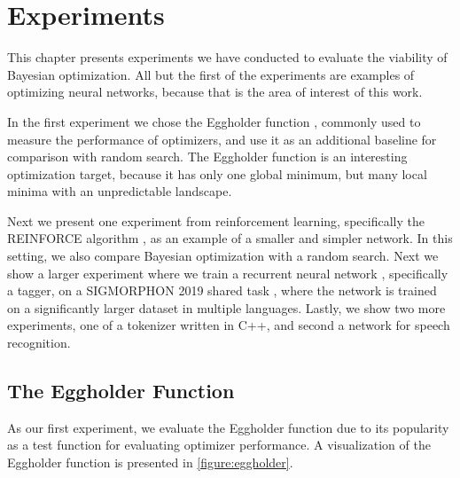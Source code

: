 \chapter{Experiments}
\label{chapter:experiments}

This chapter presents experiments we have conducted to evaluate the viability of Bayesian optimization. All but the first of the experiments are examples of optimizing neural networks, because that is the area of interest of this work.

In the first experiment we chose the Eggholder function \citep{eggholder}, commonly used to measure the performance of optimizers, and use it as an additional baseline for comparison with random search. The Eggholder function is an interesting optimization target, because it has only one global minimum, but many local minima with an unpredictable landscape.

Next we present one experiment from reinforcement learning, specifically the REINFORCE algorithm \citep{suttonbarto2018reinforcement}, as an example of a smaller and simpler network. In this setting, we also compare Bayesian optimization with a random search. Next we show a larger experiment where we train a recurrent neural network \citep{dlbook}, specifically a tagger, on a SIGMORPHON 2019 shared task \citep{sigmorphon2019task2}, where the network is trained on a significantly larger dataset in multiple languages. Lastly, we show two more experiments, one of a tokenizer written in C++, and second a network for speech recognition.

\section{The Eggholder Function}

As our first experiment, we evaluate the Eggholder function \cite{eggholder} due to its popularity as a test function for evaluating optimizer performance. A visualization of the Eggholder function is presented in \autoref{figure:eggholder}.


